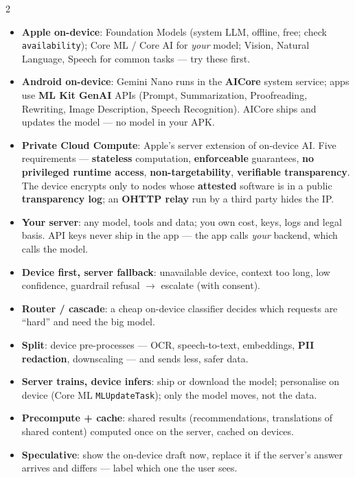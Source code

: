 \documentclass[8pt]{extarticle}
\newcommand\ct[1]{\texttt{#1}}
\newcommand\hd[1]{\par\vspace{3pt}\noindent{\bfseries\color{sheetBlue}#1}\par\vspace{1pt}}
\begin{document}
\begin{multicols}{2}
\raggedright\small{}

\hd{The options}
\begin{itemize}
  \item \textbf{Apple on-device}: Foundation Models (system LLM, offline, free; check
        \ct{availability}); Core ML / Core AI for \emph{your} model; Vision, Natural Language,
        Speech for common tasks — try these first.
  \item \textbf{Android on-device}: Gemini Nano runs in the \textbf{AICore} system service; apps
        use \textbf{ML Kit GenAI} APIs (Prompt, Summarization, Proofreading, Rewriting, Image
        Description, Speech Recognition). AICore ships and updates the model — no model in your APK.
  \item \textbf{Private Cloud Compute}: Apple's server extension of on-device AI. Five
        requirements — \textbf{stateless} computation, \textbf{enforceable} guarantees,
        \textbf{no privileged runtime access}, \textbf{non-targetability}, \textbf{verifiable
        transparency}. The device encrypts only to nodes whose \textbf{attested} software is in a
        public \textbf{transparency log}; an \textbf{OHTTP relay} run by a third party hides the IP.
  \item \textbf{Your server}: any model, tools and data; you own cost, keys, logs and legal basis.
        API keys never ship in the app — the app calls \emph{your} backend, which calls the model.
\end{itemize}

\hd{Hybrid patterns}
\begin{itemize}
  \item \textbf{Device first, server fallback}: unavailable device, context too long, low
        confidence, guardrail refusal $\to$ escalate (with consent).
  \item \textbf{Router / cascade}: a cheap on-device classifier decides which requests are
        ``hard'' and need the big model.
  \item \textbf{Split}: device pre-processes — OCR, speech-to-text, embeddings, \textbf{PII
        redaction}, downscaling — and sends less, safer data.
  \item \textbf{Server trains, device infers}: ship or download the model; personalise on device
        (Core ML \ct{MLUpdateTask}); only the model moves, not the data.
  \item \textbf{Precompute + cache}: shared results (recommendations, translations of shared
        content) computed once on the server, cached on devices.
  \item \textbf{Speculative}: show the on-device draft now, replace it if the server's answer
        arrives and differs — label which one the user sees.
\end{itemize}


\end{multicols}
\end{document}
